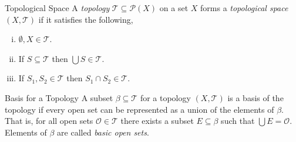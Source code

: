 \documentclass{article}
\newcommand{\tp}{\mathcal{T}}
\newcommand{\pset}[1]{\mathcal{P}(#1)}
\begin{document}
\begin{definition}{Topological Space}{}
  A \emph{topology} $\tp \subseteq \pset{X}$ on a set $X$ forms a \emph{topological space} $(X, \tp)$ if it satisfies the following,

  \begin{enumerate}[(i)]
    \item $\emptyset, X \in \tp$.
    \item If $S \subseteq \tp$ then $\bigcup S \in \tp$.
    \item If $S_1, S_2 \in \tp$ then $S_1 \cap S_2 \in \tp$.
  \end{enumerate}
\end{definition}

\begin{definition}{Basis for a Topology}{}
  A subset $\beta \subseteq \tp$ for a topology $(X, \tp)$ is a basis of the topology if every open set can be represented as a union of the elements of $\beta$.
  That is, for all open sets $\mathcal{O} \in \tp$ there exists a subset $E \subseteq \beta$ such that $\bigcup E = \mathcal{O}$.
  Elements of $\beta$ are called \emph{basic open sets}.
\end{definition}
\end{document}

